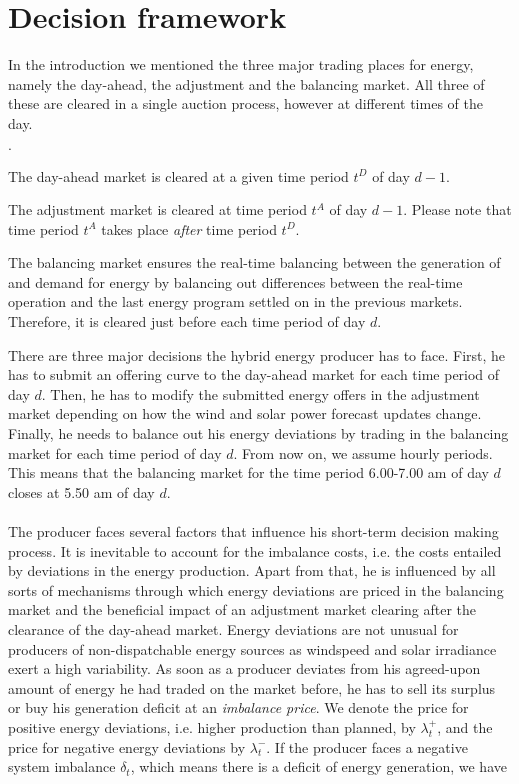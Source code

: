 \section{Decision framework}
In the introduction we mentioned the three major trading places for energy, namely the day-ahead, the adjustment and the balancing market. All three of these are cleared in a single auction process, however at different times of the day. 

\begin{list}{$\cdot$}{}
	\item The day-ahead market is cleared at a given time period $t^D$ of day $d-1$.
	\item The adjustment market is cleared at time period $t^{A}$ of day $d-1$. Please note that time period $t^{A}$ takes place \textit{after} time period $t^{D}$.
	\item The balancing market ensures the real-time balancing between the generation of and demand for energy by balancing out differences between the real-time operation and the last energy program settled on in the previous markets. Therefore, it is cleared just before each time period of day $d$. 
\end{list}
There are three major decisions the hybrid energy producer has to face. First, he has to submit an offering curve to the day-ahead market for each time period of day $d$. Then, he has to modify the submitted energy offers in the adjustment market depending on how the wind and solar power forecast updates change. Finally, he needs to balance out his energy deviations by trading in the balancing market for each time period of day $d$. From now on, we assume hourly periods. This means that the balancing market for the time period 6.00-7.00 am of day $d$ closes at 5.50 am of day $d$. 
\\
\\ The producer faces several factors that influence his short-term decision making process. It is inevitable to account for the imbalance costs, i.e. the costs entailed by deviations in the energy production. Apart from that, he is influenced by all sorts of mechanisms through which energy deviations are priced in the balancing market and the beneficial impact of an adjustment market clearing after the clearance of the day-ahead market. Energy deviations are not unusual for producers of non-dispatchable energy sources as windspeed and solar irradiance exert a high variability. As soon as a producer deviates from his agreed-upon amount of energy he had traded on the market before, he has to sell its surplus or buy his generation deficit at an \textit{imbalance price}. We denote the price for positive energy deviations, i.e. higher production than planned, by $\lambda_{t}^{+}$, and the price for negative energy deviations by $\lambda_{t}^{-}$. If the producer faces a negative system imbalance $\delta_{t}$, which means there is a deficit of energy generation, we have
